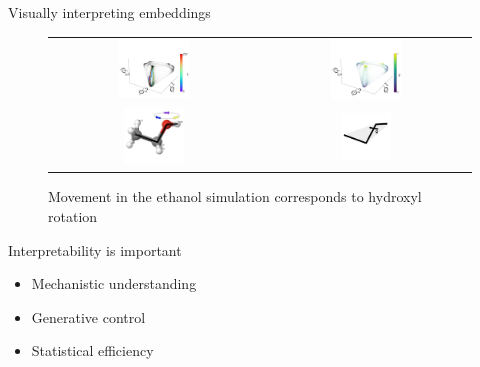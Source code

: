 \begin{frame}{Visually interpreting embeddings}
\vspace{-.5cm}
\begin{figure}[!htp]
    \centering
    \begin{tabular}{cc}
        \includegraphics[width=0.35\textwidth]{img/ethanol_trajectory.png} &
        \includegraphics[width=0.35\textwidth]{img/ethanol_color.png} \\
        \includegraphics[width=0.3\textwidth]{img/ethanol_dynamics.png} & \vspace{1cm} 
        \includegraphics[width=0.25\textwidth]{img/torsion_square.png}
    \end{tabular}
    \vspace{-2cm}
    \caption*{Movement in the ethanol simulation corresponds to hydroxyl rotation}
\end{figure}
\end{frame}

\begin{frame}{Interpretability is important}
\begin{itemize}
\item Mechanistic understanding
\item Generative control 
\item Statistical efficiency
\end{itemize}
\end{frame}

